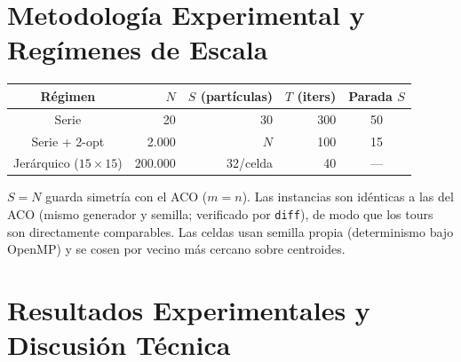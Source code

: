 \documentclass[11pt,a4paper]{article}
\begin{document}
\section{Metodología Experimental y Regímenes de Escala}
\begin{center}
\begin{tabular}{@{}crrrc@{}}
\toprule Régimen & $N$ & $S$ (partículas) & $T$ (iters) & Parada $S$ \\
\midrule Serie & 20 & 30 & 300 & 50 \\
Serie + 2-opt & 2.000 & $N$ & 100 & 15 \\
Jerárquico ($15\times15$) & 200.000 & 32/celda & 40 & --- \\
\bottomrule
\end{tabular}
\end{center}
$S=N$ guarda simetría con el ACO ($m=n$). Las instancias son idénticas a las del ACO (mismo generador y semilla; verificado por \texttt{diff}), de modo que los tours son directamente comparables. Las celdas usan semilla propia (determinismo bajo OpenMP) y se cosen por vecino más cercano sobre centroides.

\section{Resultados Experimentales y Discusión Técnica}
\end{document}
